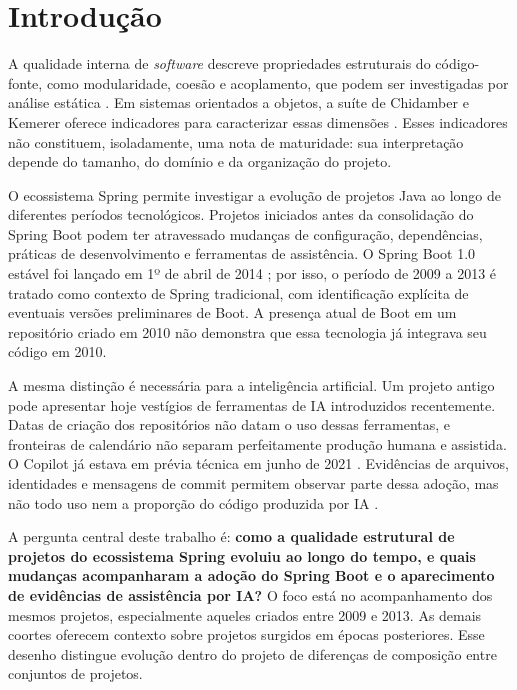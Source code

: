 \section{Introdução}
\label{sec:introducao}

A qualidade interna de \emph{software} descreve propriedades estruturais do código-fonte, como modularidade, coesão e acoplamento, que podem ser investigadas por análise estática \cite{iso25010,pressman:21}. Em sistemas orientados a objetos, a suíte de Chidamber e Kemerer oferece indicadores para caracterizar essas dimensões \cite{chidamber:94}. Esses indicadores não constituem, isoladamente, uma nota de maturidade: sua interpretação depende do tamanho, do domínio e da organização do projeto.

O ecossistema Spring permite investigar a evolução de projetos Java ao longo de diferentes períodos tecnológicos. Projetos iniciados antes da consolidação do Spring Boot podem ter atravessado mudanças de configuração, dependências, práticas de desenvolvimento e ferramentas de assistência. O Spring Boot 1.0 estável foi lançado em 1º de abril de 2014 \cite{springboot:2014}; por isso, o período de 2009 a 2013 é tratado como contexto de Spring tradicional, com identificação explícita de eventuais versões preliminares de Boot. A presença atual de Boot em um repositório criado em 2010 não demonstra que essa tecnologia já integrava seu código em 2010.

A mesma distinção é necessária para a inteligência artificial. Um projeto antigo pode apresentar hoje vestígios de ferramentas de IA introduzidos recentemente. Datas de criação dos repositórios não datam o uso dessas ferramentas, e fronteiras de calendário não separam perfeitamente produção humana e assistida. O Copilot já estava em prévia técnica em junho de 2021 \cite{copilot:2021}. Evidências de arquivos, identidades e mensagens de commit permitem observar parte dessa adoção, mas não todo uso nem a proporção do código produzida por IA \cite{robbes:26}.

A pergunta central deste trabalho é: \textbf{como a qualidade estrutural de projetos do ecossistema Spring evoluiu ao longo do tempo, e quais mudanças acompanharam a adoção do Spring Boot e o aparecimento de evidências de assistência por IA?} O foco está no acompanhamento dos mesmos projetos, especialmente aqueles criados entre 2009 e 2013. As demais coortes oferecem contexto sobre projetos surgidos em épocas posteriores. Esse desenho distingue evolução dentro do projeto de diferenças de composição entre conjuntos de projetos.

